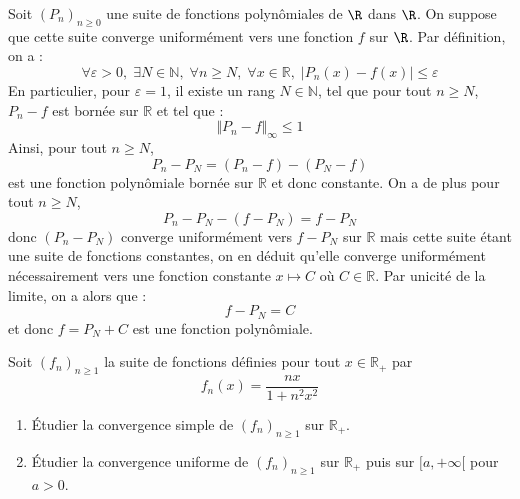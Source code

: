 \documentclass[a4paper,10pt]{report}
\begin{document}
\corr Soit $(P_{n})_{n \geq 0}$ une suite de fonctions polynômiales de $\R$ dans $\R$. On suppose que cette suite converge uniformément vers une fonction $f$ sur $\R$. Par définition, on a :
$$ \forall \varepsilon >0, \; \exists N \in \mathbb{N}, \; \forall n \geq N, \;  \forall x \in \mathbb{R}, \; \vert P_n(x)-f(x) \vert \leq \varepsilon$$
En particulier, pour $\varepsilon=1$, il existe un rang $N \in \mathbb{N}$, tel que pour tout $n \geq N$, $P_n-f$ est bornée sur $\mathbb{R}$ et tel que :
$$ \Vert P_n- f \Vert_{\infty} \leq 1$$
Ainsi, pour tout $n \geq N$,
$$ P_n-P_N = (P_n-f)-(P_N-f)$$
est une fonction polynômiale bornée sur $\mathbb{R}$ et donc constante. On a de plus pour tout $n \geq N$,
$$ P_n-P_N - (f-P_N) = f-P_N$$
donc $(P_n-P_N)$ converge uniformément vers $f-P_N$ sur $\mathbb{R}$ mais cette suite étant une suite de fonctions constantes, on en déduit qu'elle converge uniformément nécessairement vers une fonction constante $x \mapsto C$ où $C \in \mathbb{R}$. Par unicité de la limite, on a alors que :
$$ f-P_N=C$$
et donc $f=P_N+C$ est une fonction polynômiale.

\begin{Exa} Soit $(f_n)_{n \geq 1}$ la suite de fonctions définies pour tout $x \in \mathbb{R}_+$ par 
$$f_n(x) = \frac {nx}{1+n^2x^2}$$
\begin{enumerate}
\item Étudier la convergence simple de $(f_n)_{n \geq 1}$ sur $\mathbb{R}_+$.
\item Étudier la convergence uniforme de $(f_n)_{n \geq 1}$ sur $\mathbb{R}_+$ puis sur $[a, + \infty[$ pour $a>0$.
\end{enumerate}
\end{Exa}

\corr 
\end{document}
